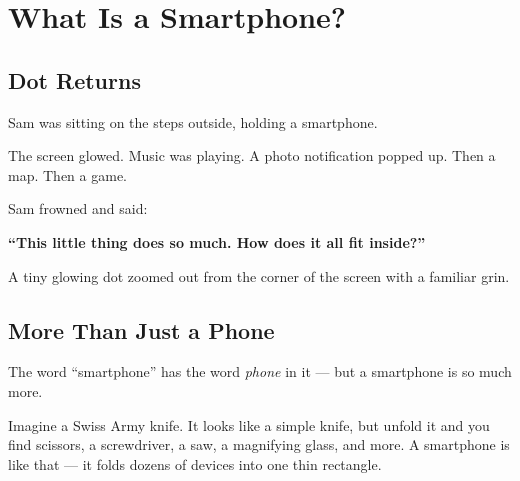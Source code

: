 
\chapter{What Is a Smartphone?}


\section*{Dot Returns}

Sam was sitting on the steps outside, holding a smartphone.

The screen glowed. Music was playing. A photo notification popped up.
Then a map. Then a game.

Sam frowned and said:

\begin{center}
  \Large\bfseries\color{TechPurple}
  ``This little thing does so much. How does it all fit inside?''
\end{center}

\vspace{8pt}

A tiny glowing dot zoomed out from the corner of the screen with a familiar grin.


\sectionrule

\section*{More Than Just a Phone}

The word ``smartphone'' has the word \emph{phone} in it — but a smartphone is so much more.

\begin{picturethis}
  Imagine a Swiss Army knife.
  It looks like a simple knife, but unfold it and you find scissors, a screwdriver,
  a saw, a magnifying glass, and more.
  A smartphone is like that — it folds dozens of devices into one thin rectangle.
\end{picturethis}

